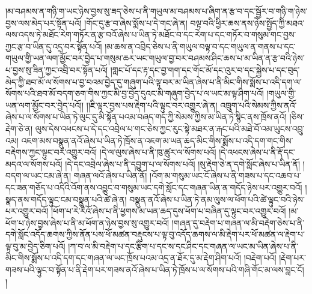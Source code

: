 །མ་བཤམས་ན་གཉི་ག་ཡང་ཉེས་བྱས་སུ་ཟད་ཅེས་པ་ནི་གཡུལ་མ་བཤམས་པ་ཞིག་ན་རྩ་བ་དང་སྦྱོར་བ་གཉི་ག་ཉེས་བྱས་ལས་མེད་པར་སྟོན་པའོ། །གོང་དུ་རྩ་བ་ཞེས་སྨོས་པ་དེ་གང་ཞེ་ན། བལྟ་བའི་ཕྱིར་ཆས་ནས་ཉེས་སྤྱོད་ཀྱི་མཐའ་ལས་འདས་ཏེ་མཐོང་རེག་གཏོར་ན་རྩ་བའོ་ཞེས་པ་ཡིན་ཏེ་མཐོང་བ་དང་རེག་པ་དང་གཏོར་བ་གསུམ་གང་བྱས་ཀྱང་རྩ་བ་ཡིན་དུ་འདྲ་བར་སྟོན་པའོ། །མ་ཆས་ན་འབྲིད་ཅེས་པ་ནི་གཡུལ་བལྟ་བ་དང་གཡུལ་ན་གནས་པ་དང་གཡུལ་གྱི་ཡན་ལག་མྱོང་བར་བྱེད་པ་གསུམ་ཆར་ཡང་གཡུལ་བྱ་བར་བཤམས་ཤིང་ཆས་པ་མ་ཡིན་ན་རྩ་བའི་ཉེས་པ་བྱས་སུ་ཟིན་ཀྱང་འབྲི་བར་སྟོན་པའོ། །གླང་པོ་དང་རྟ་དང་བྱ་གག་དང་གོང་མོ་དང་འུར་བ་དང་སྐྱེས་པ་དང་བུད་མེད་ཀྱི་ཐབ་མོ་ལ་སོགས་པ་བྱ་བའམ་བྱེད་དུ་གཞུག་པའི་ལྟ་བར་མ་ཡིན་ཞེས་པ་ནི་མིང་གིས་སྨོས་པ་འདི་དག་ལ་སོགས་པའི་ཐབ་མོ་བདག་ཅག་གིས་ཀྱང་མི་བྱ་བྱེད་དུའང་མི་གཞུག་བྱེད་པ་ལ་ཡང་མ་ལྟ་ཤིག་པའོ། །གཡུལ་གྱི་ཡན་ལག་མྱོང་བར་བྱེད་པའོ།། །།ཇི་ལྟར་བྱས་པས་རྡེག་པའི་ལྟུང་བར་འགྱུར་ཞེ་ན། འཁྲུག་པའི་སེམས་ཀྱིས་ནའོ་ཞེས་པ་ལ་སོགས་པ་ཡིན་ཏེ་ལུང་དུ་མི་སྟོན་པའམ་བཞད་གད་ཀྱི་སེམས་ཀྱིས་མ་ཡིན་ཏེ་སྙིང་ནས་ཁྲོས་ནའོ། །ཅིས་རྡེག་ཅེ་ན། ལུས་དེས་འཕངས་པ་དེ་དང་འབྲེལ་པ་གང་ཅེས་ཀྱང་རུང་སྟེ་མཐར་ན་རྐང་པའི་མཐེ་བོ་འམ་ཡུངས་འབྲུ་འམ། འཇག་མས་བསྣུན་ནའོ་ཞེས་པ་ཡིན་ཏེ་ཁྲོས་ན་འཇག་མ་ཡན་ཆད་མིང་གིས་སྨོས་པ་འདི་དག་གང་གིས་བརྡེགས་ཀྱང་ལྟུང་བར་འགྱུར་བའོ། །དེ་ལ་ལུས་ཞེས་པ་ནི་ཁུ་ཚུར་ལ་སོགས་པའོ། །དེ་འཕངས་ཞེས་པ་ནི་རྡོ་དང་མདའ་ལ་སོགས་པའོ། །དེ་དང་འབྲེལ་ཞེས་པ་ནི་དབྱུག་པ་ལ་སོགས་པའོ། །སུ་རྡེག་ཅེ་ན་དགེ་སློང་ཞེས་པ་ཡིན་ནོ། །བདག་ལ་ཡང་ངམ་ཞེ་ན། གཞན་ལའོ་ཞེས་པ་ཡིན་ནོ། །འོག་མ་གསུམ་ཡང་ངོ་ཞེས་པ་ནི་གཟས་པ་དང་འཆབ་པ་དང་ཟན་གཅོད་པ་འདིའི་འོག་ནས་འབྱུང་བ་གསུམ་ཡང་དགེ་སློང་དང་གཞན་ཡིན་ན་གདོད་ཉེས་པར་འགྱུར་བའོ། །སྣད་ནས་གདོད་ལྟུང་ངམ་བསྣུན་པའི་ཚེ་ཞེ་ན། བསྣུན་ནའོ་ཞེས་པ་ཡིན་ཏེ་ནམ་ལུས་ལ་ཕོག་པའི་ཚེ་ལྟུང་བའི་ཉེས་པར་འགྱུར་བའོ། །ཕོག་པ་རེ་རེའོ་ཞེས་པ་ནི་ཕྱགས་མ་ཡན་ཆད་དུས་ཕོག་པ་བཞིན་དུ་ལྟུང་བར་འགྱུར་བའོ། །མ་ཕོག་པ་ཉེས་བྱས་ཞེས་པ་ནི་མ་ཕོག་ན་ཉེས་བྱས་སུ་འགྱུར་བའོ། །གཞན་དུ་བརྡེག་པ་གཞན་ལ་མི་བརྡེག་ཅེས་པ་ནི་དགེ་སློང་འདོད་ཆགས་ཀྱིས་ནོན་པས་ཕོ་མཚན་བརྡུངས་པ་ལྟ་བུ་འདོད་ཆགས་ལ་མི་རྡེག་པར་ཕོ་མཚན་ལ་རྡེག་པ་ལྟ་བུ་མ་བྱེད་ཅིག་པའོ། །ཀ་བ་ལ་མི་བརྡེག་པ་དང་རྩིག་པ་དང་ས་དང་ཤིང་དང་གཞན་ལ་ཡང་མ་ཡིན་ཞེས་པ་ནི་མིང་གིས་སྨོས་པ་འདི་དག་དང་གཞན་ལ་ཡང་ཁྲོས་པའམ་འདྲ་ན་ཐོར་དུ་མ་རྡེག་ཤིག་པའོ། །བརྡེག་པའོ། །རྡེག་པར་གཟས་པའི་ལྟུང་བ་སྟོན་པ་ནི་རྡེག་པར་གཟས་ནའོ་ཞེས་པ་ཡིན་ཏེ་ཁྲོས་པ་ལ་སོགས་པའི་གཞི་གོང་མ་ལས་བླང་ངོ། །
